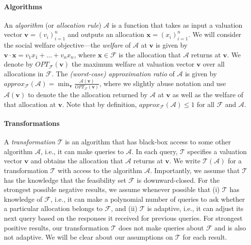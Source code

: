 \documentclass[runningheads,a4paper]{llncs}
\begin{document}
\paragraph{Algorithms} An \emph{algorithm} (or \emph{allocation rule}) $\mathcal{A}$ is a function that takes as input a valuation vector $\textbf{v}=(v_i)_{i=1}^n$ and outputs an allocation $\textbf{x}=(x_i)_{i=1}^n$. We will consider the social welfare objective---the \emph{welfare} of $\mathcal{A}$ at $\textbf{v}$ is given by $\textbf{v}\cdot\textbf{x}=v_1x_1+\dots+v_nx_n$, where $\textbf{x}\in\mathcal{F}$ is the allocation that $\mathcal{A}$ returns at $\textbf{v}$. We denote by $OPT_\mathcal{F}(\textbf{v})$ the maximum welfare at valuation vector $\textbf{v}$ over all allocations in $\mathcal{F}$. The \emph{(worst-case) approximation ratio} of $\mathcal{A}$ is given by $approx_\mathcal{F}(\mathcal{A})=\min_{\textbf{v}}\frac{\mathcal{A}(\textbf{v})}{OPT_\mathcal{F}(\textbf{v})}$, where we slightly abuse notation and use $\mathcal{A}(\textbf{v})$ to denote the the allocation returned by $\mathcal{A}$ at $\textbf{v}$ as well as the welfare of that allocation at $\textbf{v}$. Note that by definition, $approx_\mathcal{F}(\mathcal{A})\leq 1$ for all $\mathcal{F}$ and $\mathcal{A}$.

\paragraph{Transformations} A \emph{transformation} $\mathcal{T}$ is an algorithm that has black-box access to some other algorithm $\mathcal{A}$, i.e., it can make queries to $\mathcal{A}$. In each query, $\mathcal{T}$ specifies a valuation vector $\textbf{v}$ and obtains the allocation that $\mathcal{A}$ returns at $\textbf{v}$. We write $\mathcal{T}(\mathcal{A})$ for a transformation $\mathcal{T}$ with access to the algorithm $\mathcal{A}$. Importantly, we assume that $\mathcal{T}$ has the knowledge that the feasibility set $\mathcal{F}$ is downward-closed. For the strongest possible negative results, we assume whenever possible that (i) $\mathcal{T}$ has knowledge of $\mathcal{F}$, i.e., it can make a polynomial number of queries to ask whether a particular allocation belongs to $\mathcal{F}$, and (ii) $\mathcal{T}$ is adaptive, i.e., it can adjust its next query based on the responses it received for previous queries. For strongest positive results, our transformation $\mathcal{T}$ does not make queries about $\mathcal{F}$ and is also not adaptive. We will be clear about our assumptions on $\mathcal{T}$ for each result.
\end{document}
